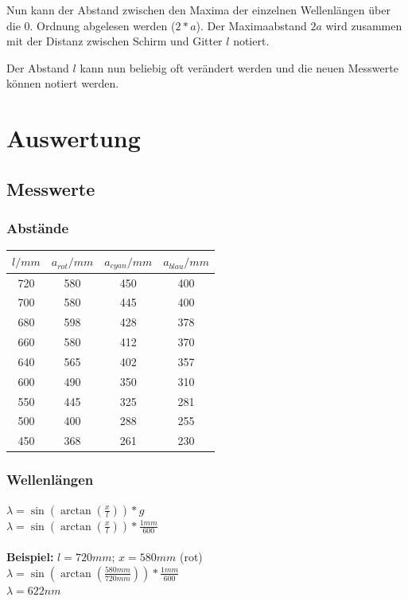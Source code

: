 \documentclass[12pt, a4paper]{article}
\begin{document}
Nun kann der Abstand zwischen den Maxima der einzelnen Wellenlängen über die 0. Ordnung abgelesen werden ($2*a$).
Der Maximaabstand $2a$ wird zusammen mit der Distanz zwischen Schirm und Gitter $l$ notiert.

Der Abstand $l$ kann nun beliebig oft verändert werden und die neuen Messwerte können notiert werden.

\newpage

\section{Auswertung}
\subsection{Messwerte}
\subsubsection{Abstände}
\begin{tabular}{ |c|c|c|c| }
    \hline
    $l/mm$ & $a_{rot}/mm$ & $a_{cyan}/mm$ & $a_{blau}/mm$ \\
    \hline
    \hline
    720 & 580 & 450 & 400 \\
    \hline
    700 & 580 & 445 & 400 \\
    \hline
    680 & 598 & 428 & 378 \\
    \hline
    660 & 580 & 412 & 370 \\
    \hline
    640 & 565 & 402 & 357 \\
    \hline
    600 & 490 & 350 & 310 \\
    \hline
    550 & 445 & 325 & 281 \\
    \hline
    500 & 400 & 288 & 255 \\
    \hline
    450 & 368 & 261 & 230 \\
    \hline
\end{tabular}

\subsubsection{Wellenlängen}
$\lambda = \sin(\arctan(\frac{x}{l})) * g$\\
$\lambda = \sin(\arctan(\frac{x}{l})) * \frac{1mm}{600}$\\\\
\textbf{Beispiel:} $l = 720mm$; $x = 580mm$ (rot)\\
$\lambda = \sin(\arctan(\frac{580mm}{720mm}))*\frac{1mm}{600}$\\
$\lambda = 622nm$\\
\end{document}
